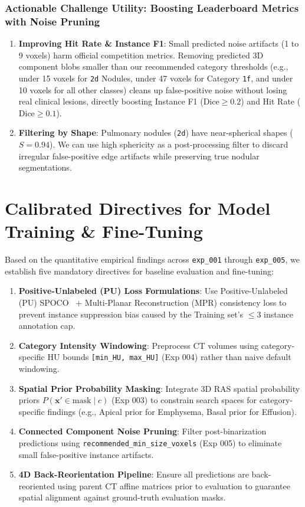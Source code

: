 \documentclass[11pt,a4paper]{article}
\begin{document}
\subsubsection*{Actionable Challenge Utility: Boosting Leaderboard Metrics with Noise Pruning}
\begin{enumerate}
    \item \textbf{Improving Hit Rate \& Instance F1}: Small predicted noise artifacts (1 to 9 voxels) harm official competition metrics. Removing predicted 3D component blobs smaller than our recommended category thresholds (e.g., under 15 voxels for \texttt{2d} Nodules, under 47 voxels for Category \texttt{1f}, and under 10 voxels for all other classes) cleans up false-positive noise without losing real clinical lesions, directly boosting Instance F1 ($\text{Dice} \ge 0.2$) and Hit Rate ($\text{Dice} \ge 0.1$).
    \item \textbf{Filtering by Shape}: Pulmonary nodules (\texttt{2d}) have near-spherical shapes ($S = 0.94$). We can use high sphericity as a post-processing filter to discard irregular false-positive edge artifacts while preserving true nodular segmentations.
\end{enumerate}

\section{Calibrated Directives for Model Training \& Fine-Tuning}

Based on the quantitative empirical findings across \texttt{exp\_001} through \texttt{exp\_005}, we establish five mandatory directives for baseline evaluation and fine-tuning:

\begin{enumerate}
    \item \textbf{Positive-Unlabeled (PU) Loss Formulations}: Use Positive-Unlabeled (PU) SPOCO~\cite{wolny2022spoco} + Multi-Planar Reconstruction (MPR) consistency loss to prevent instance suppression bias caused by the Training set's $\le 3$ instance annotation cap.
    \item \textbf{Category Intensity Windowing}: Preprocess CT volumes using category-specific HU bounds \texttt{[min\_HU, max\_HU]} (Exp 004) rather than naive default windowing.
    \item \textbf{Spatial Prior Probability Masking}: Integrate 3D RAS spatial probability priors $P(\mathbf{x}' \in \text{mask} \mid c)$ (Exp 003) to constrain search spaces for category-specific findings (e.g., Apical prior for Emphysema, Basal prior for Effusion).
    \item \textbf{Connected Component Noise Pruning}: Filter post-binarization predictions using \texttt{recommended\_min\_size\_voxels} (Exp 005) to eliminate small false-positive instance artifacts.
    \item \textbf{4D Back-Reorientation Pipeline}: Ensure all predictions are back-reoriented using parent CT affine matrices prior to evaluation to guarantee spatial alignment against ground-truth evaluation masks.
\end{enumerate}
\end{document}
